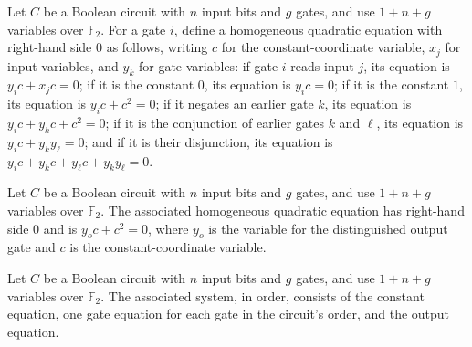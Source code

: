 \begin{definition}
\label{FABL.BooleanCircuit.circuitQuadraticGateEquation}
\leanok
{}
Let $C$ be a Boolean circuit with $n$ input bits and $g$ gates, and use $1+n+g$
variables over $\mathbb{F}_2$. For a gate $i$, define a homogeneous quadratic equation
with right-hand side $0$ as follows, writing $c$ for the constant-coordinate variable,
$x_j$ for input variables, and $y_k$ for gate variables: if gate $i$ reads input $j$,
its equation is $y_i c+x_j c=0$; if it is the constant $0$, its equation is $y_i c=0$;
if it is the constant $1$, its equation is $y_i c+c^2=0$; if it negates an earlier gate
$k$, its equation is $y_i c+y_k c+c^2=0$; if it is the conjunction of earlier gates $k$
and $\ell$, its equation is $y_i c+y_k y_\ell=0$; and if it is their disjunction, its
equation is $y_i c+y_k c+y_\ell c+y_k y_\ell=0$.
\end{definition}

\begin{definition}
\label{FABL.BooleanCircuit.circuitQuadraticOutputEquation}
\leanok
{}
Let $C$ be a Boolean circuit with $n$ input bits and $g$ gates, and use $1+n+g$
variables over $\mathbb{F}_2$. The associated homogeneous quadratic equation has
right-hand side $0$ and is $y_o c+c^2=0$, where $y_o$ is the variable for the
distinguished output gate and $c$ is the constant-coordinate variable.
\end{definition}

\begin{definition}
\label{FABL.BooleanCircuit.circuitQuadraticSystem}
\leanok
{}
Let $C$ be a Boolean circuit with $n$ input bits and $g$ gates, and use $1+n+g$
variables over $\mathbb{F}_2$. The associated system, in order, consists of the
constant equation, one gate equation for each gate in the circuit's order, and the
output equation.
\end{definition}

